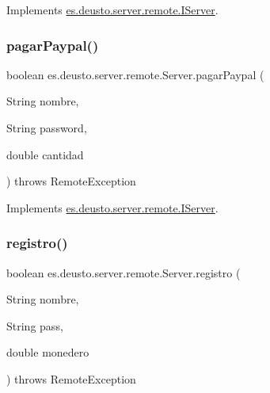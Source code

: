 Implements \mbox{\hyperlink{interfacees_1_1deusto_1_1server_1_1remote_1_1_i_server_ac764551111551c2b167bf3d0fb53fc7b}{es.\+deusto.\+server.\+remote.\+I\+Server}}.

\mbox{\label{classes_1_1deusto_1_1server_1_1remote_1_1_server_a31c17e7534d892c61a2ac36c87e08dbc}} 
\subsubsection{\texorpdfstring{pagarPaypal()}{pagarPaypal()}}
{\footnotesize\ttfamily boolean es.\+deusto.\+server.\+remote.\+Server.\+pagar\+Paypal (\begin{DoxyParamCaption}\item[{String}]{nombre,  }\item[{String}]{password,  }\item[{double}]{cantidad }\end{DoxyParamCaption}) throws Remote\+Exception}



Implements \mbox{\hyperlink{interfacees_1_1deusto_1_1server_1_1remote_1_1_i_server_ae5fa0451aba57506212a5bd3674c060a}{es.\+deusto.\+server.\+remote.\+I\+Server}}.

\mbox{\label{classes_1_1deusto_1_1server_1_1remote_1_1_server_abd8ccf5305f02831be069dd3b53a3b5d}} 
\subsubsection{\texorpdfstring{registro()}{registro()}}
{\footnotesize\ttfamily boolean es.\+deusto.\+server.\+remote.\+Server.\+registro (\begin{DoxyParamCaption}\item[{String}]{nombre,  }\item[{String}]{pass,  }\item[{double}]{monedero }\end{DoxyParamCaption}) throws Remote\+Exception}



